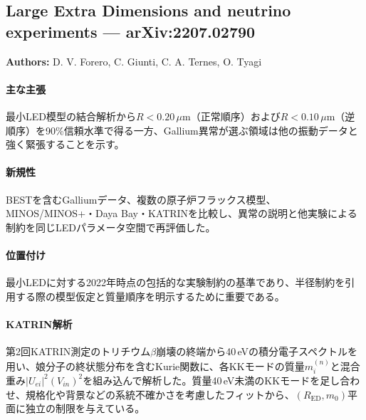 \subsection{Large Extra Dimensions and neutrino experiments --- arXiv:2207.02790}

\textbf{Authors:} D. V. Forero, C. Giunti, C. A. Ternes, O. Tyagi

\paragraph{主な主張}
最小LED模型の結合解析から$R<0.20\,\mu\mathrm{m}$（正常順序）および$R<0.10\,\mu\mathrm{m}$（逆順序）を90\%信頼水準で得る一方、Gallium異常が選ぶ領域は他の振動データと強く緊張することを示す\cite{Forero:2022LEDExperiments}。

\paragraph{新規性}
BESTを含むGalliumデータ、複数の原子炉フラックス模型、MINOS/MINOS+・Daya Bay・KATRINを比較し、異常の説明と他実験による制約を同じLEDパラメータ空間で再評価した。

\paragraph{位置付け}
最小LEDに対する2022年時点の包括的な実験制約の基準であり、半径制約を引用する際の模型仮定と質量順序を明示するために重要である。

\paragraph{KATRIN解析}
第2回KATRIN測定のトリチウム$\beta$崩壊の終端から40\,eVの積分電子スペクトルを用い、娘分子の終状態分布を含むKurie関数に、各KKモードの質量$m_i^{(n)}$と混合重み$|U_{ei}|^2(V_{in})^2$を組み込んで解析した。質量40\,eV未満のKKモードを足し合わせ、規格化や背景などの系統不確かさを考慮したフィットから、$(R_{\mathrm{ED}},m_0)$平面に独立の制限を与えている\cite{Forero:2022LEDExperiments}。
